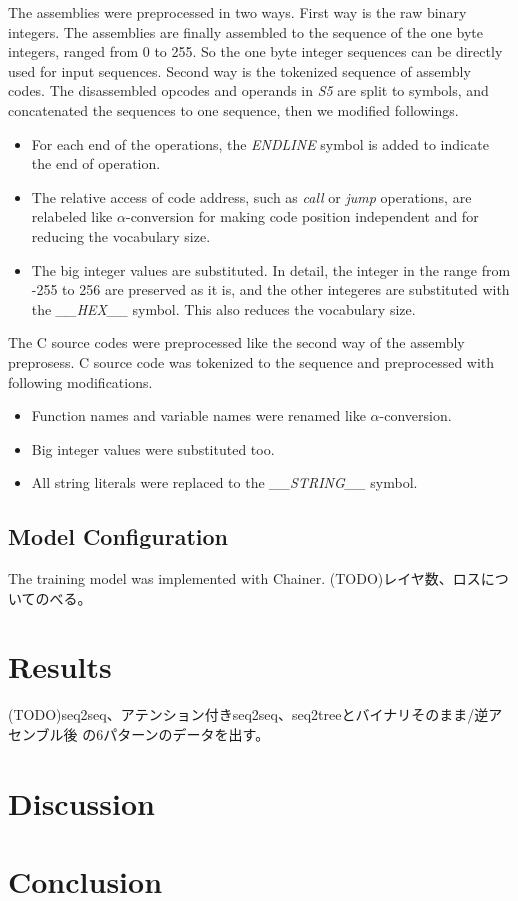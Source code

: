 \documentclass[senior,final,11pt]{iscs-thesis}
\begin{document}
The assemblies were preprocessed in two ways.
First way is the raw binary integers. The assemblies are finally assembled to the sequence of the one byte integers, ranged from 0 to 255.
So the one byte integer sequences can be directly used for input sequences.
Second way is the tokenized sequence of assembly codes. 
The disassembled opcodes and operands in {\sl S5} are split to symbols, and concatenated the sequences to one sequence, then we modified followings.
\begin{itemize}
\item For each end of the operations, the {\sl ENDLINE} symbol is added to indicate the end of operation.
\item 
The relative access of code address, such as {\sl call} or {\sl jump} operations, 
are relabeled like $\alpha$-conversion for making code position independent and for reducing the vocabulary size.
\item The big integer values are substituted. 
In detail, the integer in the range from -255 to 256 are preserved as it is, and the other integeres are substituted with the {\sl \_\_HEX\_\_} symbol.
This also reduces the vocabulary size.
\end{itemize}

The C source codes were preprocessed like the second way of the assembly preprosess.
C source code was tokenized to the sequence and preprocessed with following modifications.
\begin{itemize}
\item Function names and variable names were renamed like $\alpha$-conversion.
\item Big integer values were substituted too. 
\item All string literals were replaced to the {\sl \_\_STRING\_\_} symbol.
\end{itemize}



\section{Model Configuration}
The training model was implemented with Chainer.
(TODO)レイヤ数、ロスについてのべる。

\chapter{Results}
(TODO)seq2seq、アテンション付きseq2seq、seq2treeとバイナリそのまま/逆アセンブル後 の6パターンのデータを出す。
\chapter{Discussion}
\chapter{Conclusion}



\end{document}
